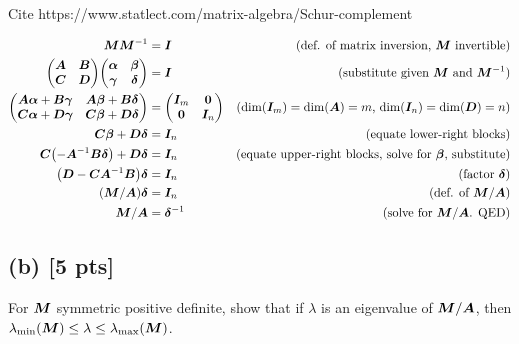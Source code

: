 \documentclass[twoside,10pt]{article}
\begin{document}
Cite https://www.statlect.com/matrix-algebra/Schur-complement

\begin{align*}
  \mtx{M}\mtx{M}^{-1} &= \mtx{I}&\text{(def. of matrix inversion, $\mtx{M}$ invertible)}\\
  \begin{pmatrix}
    \mtx{A} & \mtx{B}\\
    \mtx{C} & \mtx{D}
  \end{pmatrix}
  \begin{pmatrix}
    \mtx{\alpha} & \mtx{\beta} \\
    \mtx{\gamma} & \mtx{\delta}
  \end{pmatrix} &= \mtx{I}&\text{(substitute given $\mtx{M}$ and $\mtx{M}^{-1}$)}\\
  \begin{pmatrix}
    \mtx{A}\mtx{\alpha} +\mtx{B}\mtx{\gamma} & \mtx{A}\mtx{\beta} +\mtx{B}\mtx{\delta}\\
    \mtx{C}\mtx{\alpha} +\mtx{D}\mtx{\gamma} & \mtx{C}\mtx{\beta} +\mtx{D}\mtx{\delta}
  \end{pmatrix} &=
  \begin{pmatrix}
    \mtx{I}_m & \mtx{0}\\
    \mtx{0} & \mtx{I}_n
  \end{pmatrix}&\text{($\dim(\mtx{I}_m) = \dim(\mtx{A}) = m$, $\dim(\mtx{I}_n) = \dim(\mtx{D}) = n$)}\\
  \mtx{C}\mtx{\beta} +\mtx{D}\mtx{\delta} &=\mtx{I}_n&\text{(equate lower-right blocks)}\\
  \mtx{C}\left(-\mtx{A}^{-1}\mtx{B}\mtx{\delta}\right) + \mtx{D}\mtx{\delta} &=\mtx{I}_n&\text{(equate upper-right blocks, solve for $\mtx{\beta}$, substitute)}\\
  \left(\mtx{D} - \mtx{C}\mtx{A}^{-1}\mtx{B}\right)\mtx{\delta} &=\mtx{I}_n&\text{(factor $\mtx{\delta}$)}\\
  \left(\mtx{M} / \mtx{A}\right)\mtx{\delta} &=\mtx{I}_n&\text{(def. of $\mtx{M} / \mtx{A}$)}\\
  \mtx{M} / \mtx{A} &=\mtx{\delta}^{-1}&\text{(solve for $\mtx{M} / \mtx{A}$. QED)}\\
\end{align*}

\subsection*{(b) [5 pts]} 
For $\bm{M}$ symmetric positive definite, show that if $\lambda$ is an eigenvalue of $\bm{M} / \bm{A}$, then $\lambda_{\min}\left(\mtx{M} \right) \leq \lambda \leq \lambda_{\max}\left(\mtx{M}\right)$.
\end{document}
